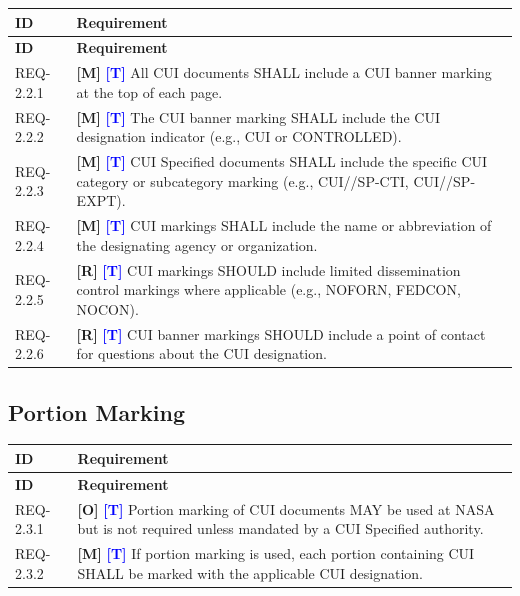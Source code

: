 \documentclass[11pt,letterpaper]{article}
\begin{document}
\begin{longtable}{@{}p{1.4cm}p{11.6cm}@{}}
\toprule
\textbf{ID} & \textbf{Requirement} \\
\midrule
\endfirsthead
\toprule
\textbf{ID} & \textbf{Requirement} \\
\midrule
\endhead

REQ-2.2.1 & \textcolor{mandatory}{\textbf{[M]}} \textcolor{blue}{\textbf{[T]}} All CUI documents SHALL include a CUI banner marking at the top of each page. \\[6pt]

REQ-2.2.2 & \textcolor{mandatory}{\textbf{[M]}} \textcolor{blue}{\textbf{[T]}} The CUI banner marking SHALL include the CUI designation indicator (e.g., CUI or CONTROLLED). \\[6pt]

REQ-2.2.3 & \textcolor{mandatory}{\textbf{[M]}} \textcolor{blue}{\textbf{[T]}} CUI Specified documents SHALL include the specific CUI category or subcategory marking (e.g., CUI//SP-CTI, CUI//SP-EXPT). \\[6pt]

REQ-2.2.4 & \textcolor{mandatory}{\textbf{[M]}} \textcolor{blue}{\textbf{[T]}} CUI markings SHALL include the name or abbreviation of the designating agency or organization. \\[6pt]

REQ-2.2.5 & \textcolor{recommended}{\textbf{[R]}} \textcolor{blue}{\textbf{[T]}} CUI markings SHOULD include limited dissemination control markings where applicable (e.g., NOFORN, FEDCON, NOCON). \\[6pt]

REQ-2.2.6 & \textcolor{recommended}{\textbf{[R]}} \textcolor{blue}{\textbf{[T]}} CUI banner markings SHOULD include a point of contact for questions about the CUI designation. \\[6pt]

\bottomrule
\end{longtable}

\subsection{Portion Marking}

\begin{longtable}{@{}p{1.4cm}p{11.6cm}@{}}
\toprule
\textbf{ID} & \textbf{Requirement} \\
\midrule
\endfirsthead
\toprule
\textbf{ID} & \textbf{Requirement} \\
\midrule
\endhead

REQ-2.3.1 & \textcolor{optional}{\textbf{[O]}} \textcolor{blue}{\textbf{[T]}} Portion marking of CUI documents MAY be used at NASA but is not required unless mandated by a CUI Specified authority. \\[6pt]

REQ-2.3.2 & \textcolor{mandatory}{\textbf{[M]}} \textcolor{blue}{\textbf{[T]}} If portion marking is used, each portion containing CUI SHALL be marked with the applicable CUI designation. \\[6pt]

\bottomrule
\end{longtable}
\end{document}
